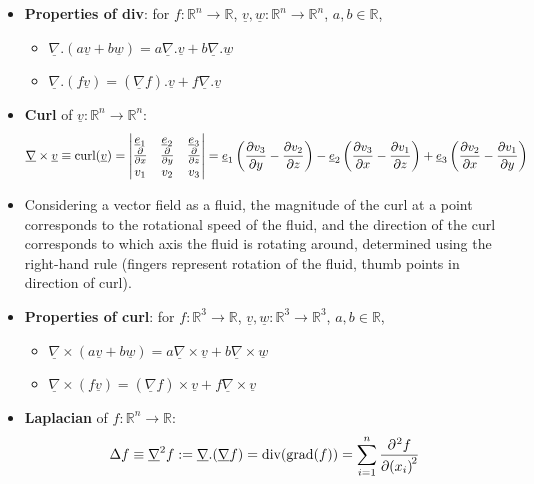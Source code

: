 \begin{itemize}
	\item \textbf{Properties of div}: for $f: \mathbb{R}^n \to \mathbb{R}$, $\underline{v}, \underline{w}: \mathbb{R}^n \to \mathbb{R}^n$, $a, b \in \mathbb{R}$,
	\begin{itemize}
		\item $\underline{\nabla} . (a \underline{v} + b \underline{w}) = a \underline{\nabla} . \underline{v} + b \underline{\nabla} . \underline{w}$
		\item $\underline{\nabla} . (f \underline{v}) = (\underline{\nabla} f) . \underline{v} + f \underline{\nabla} . \underline{v}$
	\end{itemize}
	\item \textbf{Curl} of $\underline{v}: \mathbb{R}^n \to \mathbb{R}^n$:
	\[
		\underline{\nabla} \times \underline{v} \equiv \text{curl}(\underline{v}) = \begin{vmatrix}
			\underline{e}_1 & \underline{e}_2 & \underline{e}_3 \\
			\diffp{}{x} & \diffp{}{y} & \diffp{}{z} \\
			v_1 & v_2 & v_3
		\end{vmatrix} = \underline{e}_1 \left( \diffp{v_3}{y} - \diffp{v_2}{z} \right) - \underline{e}_2 \left( \diffp{v_3}{x} - \diffp{v_1}{z} \right) + \underline{e}_3 \left( \diffp{v_2}{x} - \diffp{v_1}{y} \right)
	\]
	\item Considering a vector field as a fluid, the magnitude of the curl at a point corresponds to the rotational speed of the fluid, and the direction of the curl corresponds to which axis the fluid is rotating around, determined using the right-hand rule (fingers represent rotation of the fluid, thumb points in direction of curl).
	\item \textbf{Properties of curl}: for $f: \mathbb{R}^3 \to \mathbb{R}$, $\underline{v}, \underline{w}: \mathbb{R}^3 \to \mathbb{R}^3$, $a, b \in \mathbb{R}$,
	\begin{itemize}
		\item $\underline{\nabla} \times (a \underline{v} + b \underline{w}) = a \underline{\nabla} \times \underline{v} + b \underline{\nabla} \times \underline{w}$
		\item $\underline{\nabla} \times (f \underline{v}) = (\underline{\nabla} f) \times \underline{v} + f \underline{\nabla} \times \underline{v}$
	\end{itemize}
	\item \textbf{Laplacian} of $f: \mathbb{R}^n \to \mathbb{R}$:
	\[
		\Delta f \equiv \underline{\nabla}^2 f := \underline{\nabla} . (\underline{\nabla} f) = \text{div}(\text{grad}(f)) = \sum_{i = 1}^n \diffp[2]{f}{x_i}
\]
\end{itemize}
